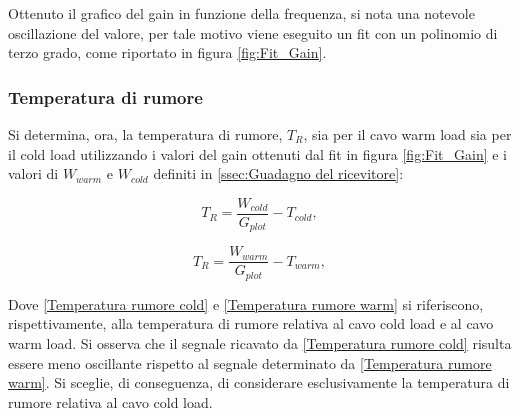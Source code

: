 Ottenuto il grafico del gain in funzione della frequenza, si nota una notevole oscillazione del valore, per tale motivo viene eseguito un fit con un polinomio di terzo grado, come riportato in figura \ref{fig:Fit_Gain}.

\subsubsection{Temperatura di rumore}
Si determina, ora, la temperatura di rumore, $T_{R}$, sia per il cavo warm load sia per il cold load utilizzando i valori del gain ottenuti dal fit in figura \ref{fig:Fit_Gain} e i valori di $W_{warm}$ e $W_{cold}$ definiti in \ref{ssec:Guadagno del ricevitore}:
 
\begin{equation}
T_{R} = \dfrac{W_{cold}}{G_{plot}}-T_{cold},
\label{Temperatura rumore cold}
\end{equation}

\begin{equation}
T_{R} = \dfrac{W_{warm}}{G_{plot}}-T_{warm},
\label{Temperatura rumore warm}
\end{equation}

Dove \eqref{Temperatura rumore cold} e \eqref{Temperatura rumore warm} si riferiscono, rispettivamente, alla temperatura di rumore relativa al cavo cold load e al cavo warm load.
Si osserva che il segnale ricavato da \eqref{Temperatura rumore cold} risulta essere meno oscillante rispetto al segnale determinato da \eqref{Temperatura rumore warm}. Si sceglie, di conseguenza, di considerare esclusivamente la temperatura di rumore relativa al cavo cold load.

